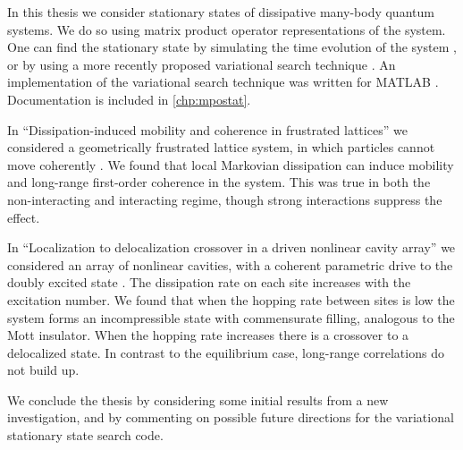 In this thesis we consider stationary states of dissipative many-body quantum systems. We do so using matrix product operator representations of the system. One can find the stationary state by simulating the time evolution of the system \cite{Vidal2004,Schollwock2011}, or by using a more recently proposed variational search technique \cite{Cui2015,Mascarenhas2015}. An implementation of the variational search technique was written for MATLAB \cite{otb:gitVSSS,MATLAB}. Documentation is included in \cref{chp:mpostat}.

In ``Dissipation-induced mobility and coherence in frustrated lattices'' we considered a geometrically frustrated lattice system, in which particles cannot move coherently \cite{Owen2017}. We found that local Markovian dissipation can induce mobility and long-range first-order coherence in the system. This was true in both the non-interacting and interacting regime, though strong interactions suppress the effect.

In ``Localization to delocalization crossover in a driven nonlinear cavity array'' we considered an array of nonlinear cavities, with a coherent parametric drive to the doubly excited state \cite{Brown2018}. The dissipation rate on each site increases with the excitation number. We found that when the hopping rate between sites is low the system forms an incompressible state with commensurate filling, analogous to the Mott insulator. When the hopping rate increases there is a crossover to a delocalized state. In contrast to the equilibrium case, long-range correlations do not build up.

We conclude the thesis by considering some initial results from a new investigation, and by commenting on possible future directions for the variational stationary state search code.